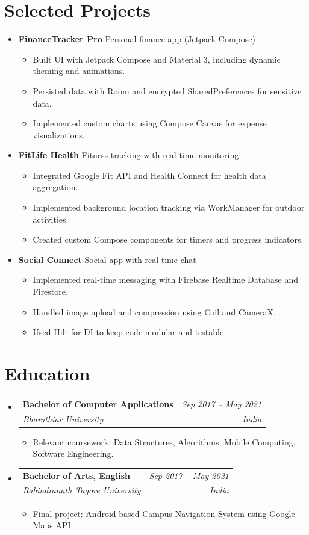 \documentclass[a4paper,11pt]{article}
\makeatletter
\newcommand{\resumeSubheading}[4]{
    \vspace{2pt}\item
    \begin{tabular*}{\textwidth}[t]{@{\extracolsep{\fill}} l r}
        \textbf{#1} & \textit{#2} \\
        \textit{#3} & \textit{#4} \\
    \end{tabular*}\vspace{2pt}
}
\newcommand{\resumeItem}[1]{
    \item\small{#1}
}
\makeatother
\begin{document}
\section{Selected Projects}
\begin{itemize}[leftmargin=0.12in, label={}]
    \item \textbf{FinanceTracker Pro} \quad Personal finance app (Jetpack Compose)
    \begin{itemize}[leftmargin=0.18in]
        \resumeItem{Built UI with Jetpack Compose and Material 3, including dynamic theming and animations.}
        \resumeItem{Persisted data with Room and encrypted SharedPreferences for sensitive data.}
        \resumeItem{Implemented custom charts using Compose Canvas for expense visualizations.}
    \end{itemize}
    
    \item \textbf{FitLife Health} \quad Fitness tracking with real-time monitoring
    \begin{itemize}[leftmargin=0.18in]
        \resumeItem{Integrated Google Fit API and Health Connect for health data aggregation.}
        \resumeItem{Implemented background location tracking via WorkManager for outdoor activities.}
        \resumeItem{Created custom Compose components for timers and progress indicators.}
    \end{itemize}
    
    \item \textbf{Social Connect} \quad Social app with real-time chat
    \begin{itemize}[leftmargin=0.18in]
        \resumeItem{Implemented real-time messaging with Firebase Realtime Database and Firestore.}
        \resumeItem{Handled image upload and compression using Coil and CameraX.}
        \resumeItem{Used Hilt for DI to keep code modular and testable.}
    \end{itemize}
\end{itemize}

\section{Education}
\begin{itemize}[leftmargin=0.12in, label={}]
 \resumeSubheading
    {Bachelor of Computer Applications}{Sep 2017 -- May 2021}
    {Bharathiar University} {India}
    \begin{itemize}[leftmargin=0.18in]
        \resumeItem{Relevant coursework: Data Structures, Algorithms, Mobile Computing, Software Engineering.}
    \end{itemize}

 \resumeSubheading
    {Bachelor of Arts, English}{Sep 2017 -- May 2021}
    {Rabindranath Tagore University} {India}
    \begin{itemize}[leftmargin=0.18in]
        \resumeItem{Final project: Android-based Campus Navigation System using Google Maps API.}
    \end{itemize}
\end{itemize}
\end{document}
